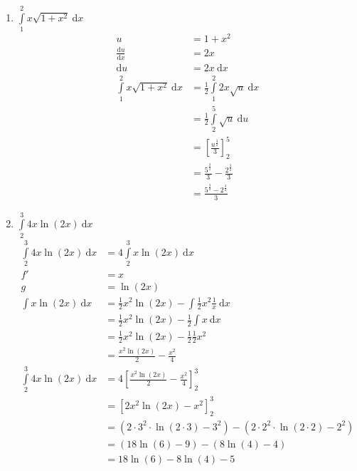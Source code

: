 \documentclass[10pt]{article}
\begin{document}
\begin{enumerate}[start=5,leftmargin=1in]
\begin{enumerate}
        \item $\int\limits_1^2 x \sqrt{1+x^2} \: \text{d}x$
        \begin{align*}
            u &= 1 + x^2 \\ 
            \frac{\text{d}u}{\text{d}x} &= 2x \\
            \text{d}u &= 2x \: \text{d}x \\
            \int\limits_1^2 x \sqrt{1+x^2} \: \text{d}x &= \frac{1}{2} \int\limits_1^2 2x \sqrt{u} \: \text{d}x \\
            &= \frac{1}{2} \int\limits_2^5 \sqrt{u} \: \text{d}u \\
            &= \left[\frac{u^{\frac{3}{2}}}{3}\right]_2^5 \\
            &= \frac{5^{\frac{3}{2}}}{3} - \frac{2^{\frac{3}{2}}}{3} \\
            &= \frac{5^{\frac{3}{2}} - 2^{\frac{3}{2}}}{3}
        \end{align*}

        \item $\int\limits_2^3 4x \ln(2x) \: \text{d}x$
        \begin{align*}
            \int\limits_2^3 4x \ln(2x) \: \text{d}x &= 4 \int\limits_2^3 x \ln(2x) \: \text{d}x \\
            f' &= x \\
            g &= \ln(2x) \\
            \int x \ln(2x) \: \text{d}x &= \frac{1}{2} x^2 \ln(2x) - \int \frac{1}{2} x^2 \frac{1}{x} \: \text{d}x \\
            &= \frac{1}{2} x^2 \ln(2x) - \frac{1}{2} \int x \: \text{d}x \\
            &= \frac{1}{2} x^2 \ln(2x) - \frac{1}{2} \frac{1}{2} x^2 \\ 
            &= \frac{x^2 \ln(2x)}{2} - \frac{x^2}{4} \\ 
            \int\limits_2^3 4x \ln(2x) \: \text{d}x &= 4 \left[\frac{x^2 \ln(2x)}{2} - \frac{x^2}{4}\right]_2^3 \\ 
            &= \left[2x^2 \ln(2x) - x^2\right]_2^3 \\ 
            &= (2 \cdot 3^2 \cdot \ln(2 \cdot 3) - 3^2) - (2 \cdot 2^2 \cdot \ln(2 \cdot 2) - 2^2) \\
            &= (18 \ln(6) - 9) - (8 \ln(4) - 4) \\
            &= 18 \ln(6) - 8 \ln(4) - 5
        \end{align*}


\end{enumerate}
\end{enumerate}
\end{document}
